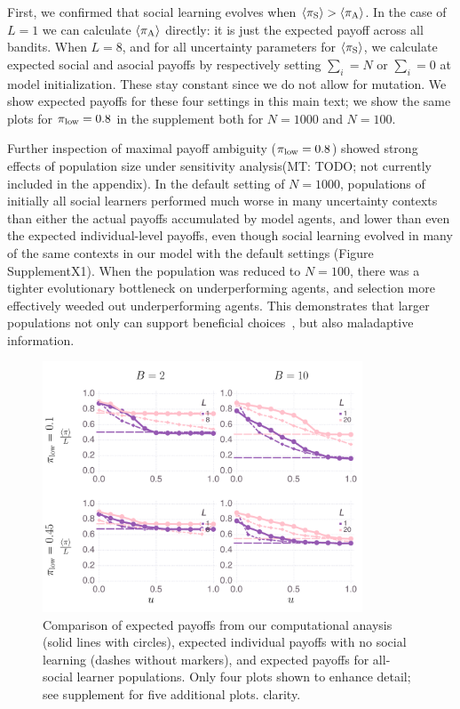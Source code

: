 \documentclass[letterpaper,11.5pt]{scrartcl}
\newcommand{\mt}[1]{{\textcolor{myorange} {({\tiny MT:} #1)}}}
\begin{document}
First, we confirmed that social learning evolves when $\langle \pi_\mathrm{S} \rangle > \langle \pi_\mathrm{A} \rangle$.
In the case of $L=1$ we can calculate $\langle \pi_\mathrm{A} \rangle$ directly: it is just the
expected payoff across all bandits. When $L=8$, and for all uncertainty parameters 
for $\langle \pi_\mathrm{S} \rangle$, we calculate expected social and asocial payoffs by respectively setting
$\sum_i = N$ or $\sum_i = 0$ at model initialization. These stay constant since
we do not allow for mutation.  We show expected payoffs for these four settings in this main text; we show the same
plots for $\pi_{\mathrm{low}} = 0.8$ in the supplement both for $N=1000$ and $N=100$.

Further inspection of maximal payoff ambiguity ($\pi_{\mathrm{low}} = 0.8$) showed strong
effects of population size under sensitivity analysis\mt{TODO; not currently included in 
the appendix}. In the default setting
of $N=1000$, populations of initially all social learners performed much worse
in many uncertainty contexts than either the actual payoffs accumulated by 
model agents, and lower than even the expected individual-level payoffs,
even though social learning evolved in many of the same contexts in our model
with the default settings (Figure SupplementX1). When the population was
reduced to $N=100$, there was a tighter evolutionary bottleneck on 
underperforming agents, and selection more effectively weeded out underperforming agents.
This demonstrates that larger populations not only can support beneficial
choices~\cite{Henrich2004}, but also maladaptive information.

\begin{figure}
  \caption{Comparison of expected payoffs from our computational anaysis (solid
    lines with circles), expected individual payoffs with no social learning
    (dashes without markers), and expected payoffs for all-social learner 
    populations. Only four plots shown to enhance detail; see supplement for
    five additional plots.
clarity.} 
  \label{fig:payoffs}
\centering
    \includegraphics[width=0.85\textwidth]{Figures/meanNetPayoffs.pdf}
\end{figure}
\end{document}
